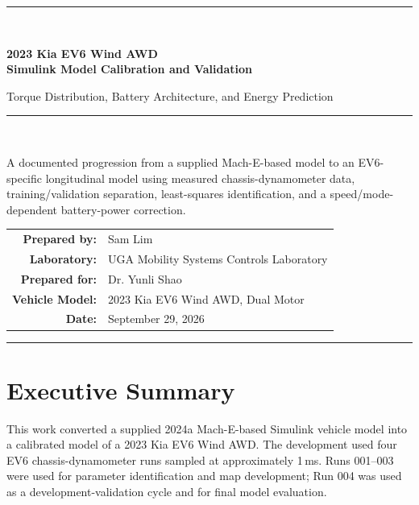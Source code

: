 \documentclass[11pt,letterpaper]{article}
\newcommand{\SI}[2]{#1\,#2}
\begin{document}
\hypersetup{pageanchor=false}

\begin{titlepage}
  \centering
  \vspace*{0.65in}
  {\color{ev6navy}\rule{\textwidth}{2.2pt}}\\[0.35in]
  {\Huge\bfseries 2023 Kia EV6 Wind AWD\\[0.12in]
  Simulink Model Calibration and Validation\par}
  \vspace{0.28in}
  {\Large Torque Distribution, Battery Architecture, and Energy Prediction\par}
  \vspace{0.32in}
  {\color{ev6navy}\rule{0.72\textwidth}{0.8pt}}\\[0.42in]

  \begin{keybox}[width=0.86\textwidth]
  \centering
  A documented progression from a supplied Mach-E-based model to an
  EV6-specific longitudinal model using measured chassis-dynamometer data,
  training/validation separation, least-squares identification, and a
  speed/mode-dependent battery-power correction.
  \end{keybox}

  \vfill
  \begin{tabular}{rl}
    \textbf{Prepared by:} & Sam Lim \\
    \textbf{Laboratory:} & UGA Mobility Systems Controls Laboratory \\
    \textbf{Prepared for:} & Dr. Yunli Shao \\
    \textbf{Vehicle Model:} & 2023 Kia EV6 Wind AWD, Dual Motor \\
    \textbf{Date:} & September 29, 2026
  \end{tabular}
  \vfill
  {\color{ev6navy}\rule{\textwidth}{2.2pt}}
\end{titlepage}

\hypersetup{pageanchor=true}

\tableofcontents
\clearpage
{}

\section{Executive Summary}

This work converted a supplied 2024a Mach-E-based Simulink vehicle model into a
calibrated model of a 2023 Kia EV6 Wind AWD. The development used four EV6
chassis-dynamometer runs sampled at approximately \SI{1}{ms}. Runs 001--003
were used for parameter identification and map development; Run 004 was used as
a development-validation cycle and for final model evaluation.
\end{document}
